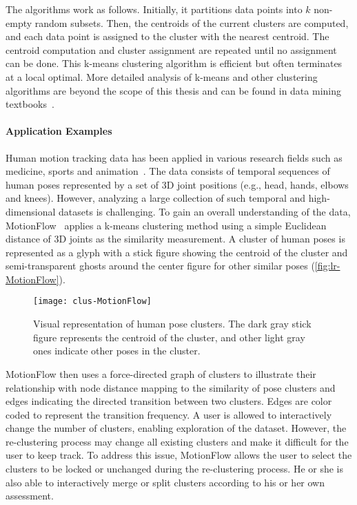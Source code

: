The algorithms work as follows. Initially, it partitions data points into $k$ non-empty random subsets. Then, the centroids of the current clusters are computed, and each data point is assigned to the cluster with the nearest centroid. The centroid computation and cluster assignment are repeated until no assignment can be done. This k-means clustering algorithm is efficient but often terminates at a local optimal. More detailed analysis of k-means and other clustering algorithms are beyond the scope of this thesis and can be found in data mining textbooks~\cite{Tan2006,Han2011}.

\paragraph{Application Examples}
Human motion tracking data has been applied in various research fields such as medicine, sports and animation~\cite{Bernard2013}. The data consists of temporal sequences of human poses represented by a set of 3D joint positions (e.g., head, hands, elbows and knees). However, analyzing a large collection of such temporal and high-dimensional datasets is challenging. To gain an overall understanding of the data, MotionFlow~\cite{Jang2016} applies a k-means clustering method using a simple Euclidean distance of 3D joints as the similarity measurement. A cluster of human poses is represented as a glyph with a stick figure showing the centroid of the cluster and semi-transparent ghosts around the center figure for other similar poses (\autoref{fig:lr-MotionFlow}).

\begin{figure}
	\centering
	\texttt{[image: clus-MotionFlow]}
	\caption[Visual representation of human pose clusters]{Visual representation of human pose clusters. The dark gray stick figure represents the centroid of the cluster, and other light gray ones indicate other poses in the cluster. }
	\label{fig:lr-MotionFlow}
\end{figure}

MotionFlow then uses a force-directed graph of clusters to illustrate their relationship with node distance mapping to the similarity of pose clusters and edges indicating the directed transition between two clusters. Edges are color coded to represent the transition frequency. A user is allowed to interactively change the number of clusters, enabling exploration of the dataset. However, the re-clustering process may change all existing clusters and make it difficult for the user to keep track. To address this issue, MotionFlow allows the user to select the clusters to be locked or unchanged during the re-clustering process. He or she is also able to interactively merge or split clusters according to his or her own assessment.

